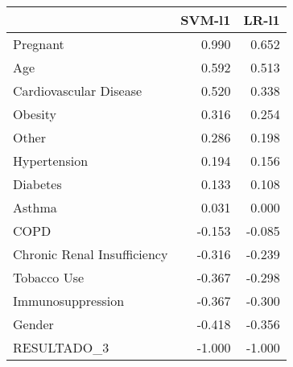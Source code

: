 \begin{tabular}{lrr}
\toprule
{} &  SVM-l1 &  LR-l1 \\
\midrule
Pregnant                    &   0.990 &  0.652 \\
Age                         &   0.592 &  0.513 \\
Cardiovascular Disease      &   0.520 &  0.338 \\
Obesity                     &   0.316 &  0.254 \\
Other                       &   0.286 &  0.198 \\
Hypertension                &   0.194 &  0.156 \\
Diabetes                    &   0.133 &  0.108 \\
Asthma                      &   0.031 &  0.000 \\
COPD                        &  -0.153 & -0.085 \\
Chronic Renal Insufficiency &  -0.316 & -0.239 \\
Tobacco Use                 &  -0.367 & -0.298 \\
Immunosuppression           &  -0.367 & -0.300 \\
Gender                      &  -0.418 & -0.356 \\
RESULTADO\_3                 &  -1.000 & -1.000 \\
\bottomrule
\end{tabular}
